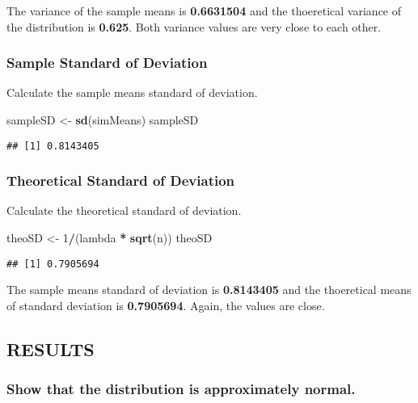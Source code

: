 \documentclass[]{article}
\newenvironment{Shaded}{\begin{snugshade}}{\end{snugshade}}
\newcommand{\KeywordTok}[1]{\textcolor[rgb]{0.13,0.29,0.53}{\textbf{#1}}}
\newcommand{\DecValTok}[1]{\textcolor[rgb]{0.00,0.00,0.81}{#1}}
\newcommand{\StringTok}[1]{\textcolor[rgb]{0.31,0.60,0.02}{#1}}
\newcommand{\OperatorTok}[1]{\textcolor[rgb]{0.81,0.36,0.00}{\textbf{#1}}}
\newcommand{\NormalTok}[1]{#1}
\begin{document}
The variance of the sample means is \textbf{0.6631504} and the
thoeretical variance of the distribution is \textbf{0.625}. Both
variance values are very close to each other.

\subsubsection{Sample Standard of
Deviation}\label{sample-standard-of-deviation}

Calculate the sample means standard of deviation.

\begin{Shaded}
\begin{Highlighting}[]
\NormalTok{sampleSD <-}\StringTok{ }\KeywordTok{sd}\NormalTok{(simMeans)}
\NormalTok{sampleSD}
\end{Highlighting}
\end{Shaded}

\begin{verbatim}
## [1] 0.8143405
\end{verbatim}

\subsubsection{Theoretical Standard of
Deviation}\label{theoretical-standard-of-deviation}

Calculate the theoretical standard of deviation.

\begin{Shaded}
\begin{Highlighting}[]
\NormalTok{theoSD <-}\StringTok{ }\DecValTok{1}\OperatorTok{/}\NormalTok{(lambda }\OperatorTok{*}\StringTok{ }\KeywordTok{sqrt}\NormalTok{(n))}
\NormalTok{theoSD}
\end{Highlighting}
\end{Shaded}

\begin{verbatim}
## [1] 0.7905694
\end{verbatim}

The sample means standard of deviation is \textbf{0.8143405} and the
thoeretical means of standard deviation is \textbf{0.7905694}. Again,
the values are close.

\subsection{RESULTS}\label{results}

\subsubsection{Show that the distribution is approximately
normal.}\label{show-that-the-distribution-is-approximately-normal.}
\end{document}

